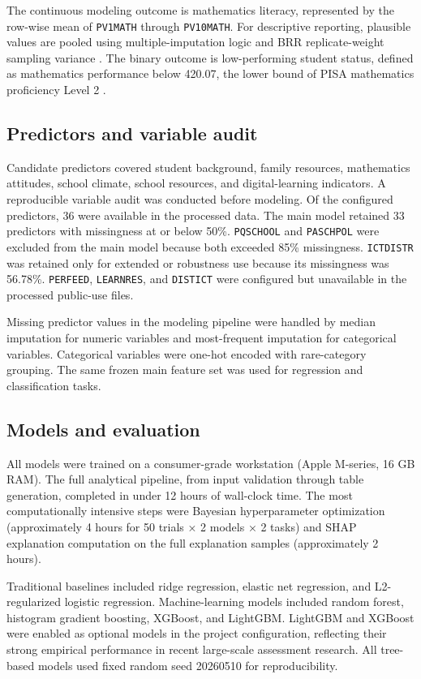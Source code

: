 \documentclass[pdflatex,sn-mathphys-ay]{sn-jnl}
\begin{document}
The continuous modeling outcome is mathematics literacy, represented by the row-wise mean of \texttt{PV1MATH} through \texttt{PV10MATH}. For descriptive reporting, plausible values are pooled using multiple-imputation logic and BRR replicate-weight sampling variance \citep{OECD_2022_technical}. The binary outcome is low-performing student status, defined as mathematics performance below 420.07, the lower bound of PISA mathematics proficiency Level 2 \citep{NCES_2022_cut_scores}.

\subsection{Predictors and variable audit}

Candidate predictors covered student background, family resources, mathematics attitudes, school climate, school resources, and digital-learning indicators. A reproducible variable audit was conducted before modeling. Of the configured predictors, 36 were available in the processed data. The main model retained 33 predictors with missingness at or below 50\%. \texttt{PQSCHOOL} and \texttt{PASCHPOL} were excluded from the main model because both exceeded 85\% missingness. \texttt{ICTDISTR} was retained only for extended or robustness use because its missingness was 56.78\%. \texttt{PERFEED}, \texttt{LEARNRES}, and \texttt{DISTICT} were configured but unavailable in the processed public-use files.

Missing predictor values in the modeling pipeline were handled by median imputation for numeric variables and most-frequent imputation for categorical variables. Categorical variables were one-hot encoded with rare-category grouping. The same frozen main feature set was used for regression and classification tasks.

\subsection{Models and evaluation}

All models were trained on a consumer-grade workstation (Apple M-series, 16 GB RAM). The full analytical pipeline, from input validation through table generation, completed in under 12 hours of wall-clock time. The most computationally intensive steps were Bayesian hyperparameter optimization (approximately 4 hours for 50 trials × 2 models × 2 tasks) and SHAP explanation computation on the full explanation samples (approximately 2 hours).

Traditional baselines included ridge regression, elastic net regression, and L2-regularized logistic regression. Machine-learning models included random forest, histogram gradient boosting, XGBoost, and LightGBM. LightGBM and XGBoost were enabled as optional models in the project configuration, reflecting their strong empirical performance in recent large-scale assessment research. All tree-based models used fixed random seed 20260510 for reproducibility.
\end{document}
